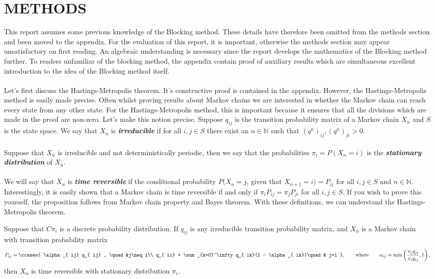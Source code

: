 \documentclass[11pt,english,a4paper]{article}
\begin{document}
\section*{\uppercase{Methods}}
This report assumes some previous knowledge of the Blocking method. These details have therefore been omitted from the methods section and been moved to the appendix. For the evaluation of this report, it is important, otherwise the methods section may appear unsatisfactory on first reading. An algebraic understanding is necessary since the report develops the mathematics of the Blocking method further. To readers unfamiliar of the blocking method, the appendix contain proof of auxiliary results which are simultaneous excellent introduction to the idea of the Blocking method itself. \\
\\
Let's first discuss the Hastings-Metropolis theorem. It's constructive proof is contained in the appendix. However, the Hastings-Metropolis method is easily made precise. Often whilst proving results about Markov chains we are interested in whether the Markov chain can reach every state from any other state. For the Hastings-Metropolis method, this is important because it ensures that all the divisions which are made in the proof are non-zero. Let's make this notion precise. Suppose $q_{  ij}$ is the transition probability matrix of a Markov chain $X_n$ and $S$ is the state space. We say that $X_n$ is \textit{\textbf{irreducible}} if for all $i,j \in S$ there exist an $n \in \mathbb{N}$ such that $(q^n)_{  ij}, (q^n)_{  ji} > 0$.\\
\\
Suppose that $X_n$ is irreducible and not deterministically periodic, then we say that the probabilities $\pi_i = P(X_n = i)$ is the \textit{\textbf{stationary distribution}} of $X_n$.\\
\\
We will say that $X_n$ is \textit{\textbf{time reversible}} if the conditional probability $P(X_{n} = j$, given that $X_{n+1} = i) = P_{  ij}$ for all $i,j \in S$ and $n \in \mathbb{N}$. Interestingly, it is easily shown that a Markov chain is time reversible if and only if $\pi_i P_{  ij} = \pi_j P_{  ji}$ for all $i,j \in S$. If you wish to prove this yourself, the proposition follows from Markov chain property and Bayes theorem. With these definitions, we can understand the Hastings-Metropolis theorem.
\begin{theorem}
Suppose that $C\pi_i$ is a discrete probability distribution. If $q_{ij}$ is any irreducible transition probability matrix, and $X_n$ is a Markov chain with transition probability matrix 
\begin{equation}
P_{ij} = \ccases {
\alpha_{  ij} q_{  ij} , \quad &j\neq i\\
q_{  ii} + \sum_{k=0}^\infty q_{  ik}(1 - \alpha_{  ik})\quad & j=i
},\qquad \text{where} \qquad \alpha_{  ij} = \min \left( \frac{\pi_j q_{  ji}}{\pi_i q_{  ij}} , 1\right), \label{eq:metropolis}
\end{equation}
then $X_n$ is time reversible with stationary distribution $\pi_i$. \label{thm:metropolis}
\end{theorem}
\end{document}
